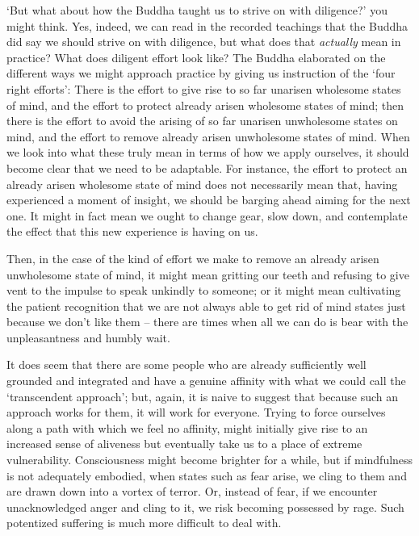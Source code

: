`But what about how the Buddha taught us to strive on with diligence?'
you might think. Yes, indeed, we can read in the recorded teachings that
the Buddha did say we should strive on with diligence, but what does
that \emph{actually} mean in practice? What does diligent effort look
like? The Buddha elaborated on the different ways we might approach
practice by giving us instruction of the `four right efforts': There is
the effort to give rise to so far unarisen wholesome states of mind, and
the effort to protect already arisen wholesome states of mind; then
there is the effort to avoid the arising of so far unarisen unwholesome
states on mind, and the effort to remove already arisen unwholesome
states of mind. When we look into what these truly mean in terms of how
we apply ourselves, it should become clear that we need to be adaptable.
For instance, the effort to protect an already arisen wholesome state of
mind does not necessarily mean that, having experienced a moment of
insight, we should be barging ahead aiming for the next one. It might in
fact mean we ought to change gear, slow down, and contemplate the effect
that this new experience is having on us.

Then, in the case of the kind of effort we make to remove an already
arisen unwholesome state of mind, it might mean gritting our teeth and
refusing to give vent to the impulse to speak unkindly to someone; or it
might mean cultivating the patient recognition that we are not always
able to get rid of mind states just because we don't like them -- there
are times when all we can do is bear with the unpleasantness and humbly
wait.

It does seem that there are some people who are already sufficiently
well grounded and integrated and have a genuine affinity with what we
could call the `transcendent approach'; but, again, it is naive to
suggest that because such an approach works for them, it will work for
everyone. Trying to force ourselves along a path with which we feel no
affinity, might initially give rise to an increased sense of aliveness
but eventually take us to a place of extreme vulnerability.
Consciousness might become brighter for a while, but if mindfulness is
not adequately embodied, when states such as fear arise, we cling to
them and are drawn down into a vortex of terror. Or, instead of fear, if
we encounter unacknowledged anger and cling to it, we risk becoming
possessed by rage. Such potentized suffering is much more difficult to
deal with.

